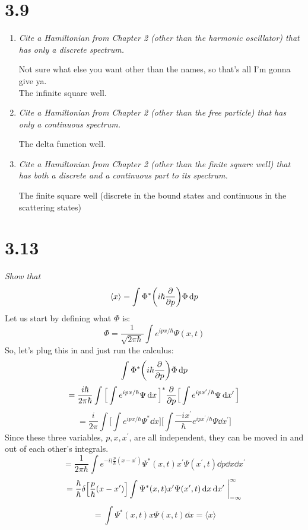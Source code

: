 \documentclass[12pt]{article}
\begin{document}
\newpage

\section*{3.9}
\begin{enumerate}[label=\alph*)]
\item \emph{Cite a Hamiltonian from Chapter 2 (other than the harmonic oscillator) that has only a discrete spectrum.}\bigskip

Not sure what else you want other than the names, so that's all I'm gonna give ya. \\
The infinite square well. 

\item \emph{Cite a Hamiltonian from Chapter 2 (other than the free particle) that has only a continuous spectrum.}\bigskip

The delta function well.

\item \emph{Cite a Hamiltonian from Chapter 2 (other than the finite square well) that has both a discrete and a continuous part to its spectrum.}\bigskip

The finite square well (discrete in the bound states and continuous in the scattering states)
\end{enumerate}

\newpage

\section*{3.13}
\emph{Show that}
\[\langle x \rangle = \int \Phi^* \qty(i\hbar\pdv{p})\Phi \dd{p}\]\bigskip
Let us start by defining what $\Phi$ is:
\[\Phi = \frac{1}{\sqrt{2\pi \hbar}}\int e^{ipx/\hbar} \Psi(x,t)\]
So, let's plug this in and just run the calculus:
\[\int \Phi^* \qty(i\hbar\pdv{p})\Phi \dd{p}\]
\[= \frac{i\hbar}{2 \pi \hbar} \int \Big[\int e^{ipx/\hbar} \Psi \dd{x}\Big]^*\pdv{p}\Big[\int e^{ipx^\prime /\hbar} \Psi \dd{x^\prime}\Big]\]
\[=\frac{i}{2 \pi} \int \Big[\int e^{ipx/\hbar} \Psi^* \dd{x}\Big] \Big[\int \frac{-ix^\prime}{\hbar}e^{ipx^\prime/\hbar} \Psi \dd{x^\prime}\Big]\]
Since these three variables, $p, x, x^\prime$, are all independent, they can be moved in and out of each other's integrals. 
\[=\frac{1}{2 \pi \hbar} \int e^{-i(\frac{p}{\hbar}(x-x^\prime)} \Psi^*(x,t) x^\prime \Psi(x^\prime, t) \dd{p}\dd{x}\dd{x^\prime}\]
\[=\frac{\hbar}{\hbar} \delta\Big[\frac{p}{\hbar}(x-x^\prime)\Big]\int\Psi^*(x,t)x^\prime\Psi(x^\prime,t)\dd{x}\dd{x^\prime}\eval^\infty_{-\infty}\]
\[=\int \Psi^*(x,t)x\Psi(x,t)\dd{x} = \langle x \rangle\]
\end{document}
